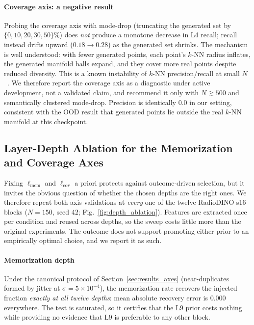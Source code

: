 \documentclass[lettersize,journal]{IEEEtran}
\begin{document}
\paragraph{Coverage axis: a negative result}
Probing the coverage axis with mode-drop (truncating the generated set by
$\{0, 10, 20, 30, 50\}\%$) does \emph{not} produce a monotone decrease in
L4 recall; recall instead drifts upward ($0.18 \to 0.28$) as the generated
set shrinks. The mechanism is well understood: with fewer generated points,
each point's $k$-NN radius inflates, the generated manifold balls expand,
and they cover more real points despite reduced diversity. This is a known
instability of $k$-NN precision/recall at small $N$~\cite{kynkaanniemi2019pr,naeem2020dc}.
We therefore report the coverage axis as a diagnostic under active
development, not a validated claim, and recommend it only with
$N \gtrsim 500$ and semantically clustered mode-drop. Precision is
identically $0.0$ in our setting, consistent with the OOD result that
generated points lie outside the real $k$-NN manifold at this checkpoint.

\subsection{Layer-Depth Ablation for the Memorization and Coverage Axes}
\label{sec:results_depth}

Fixing $\ell_{\text{mem}}$ and $\ell_{\text{cov}}$ a priori protects against
outcome-driven selection, but it invites the obvious question of whether the
chosen depths are the right ones. We therefore repeat both axis validations at
\emph{every} one of the twelve RadioDINO-s16 blocks ($N = 150$, seed $42$;
Fig.~\ref{fig:depth_ablation}). Features are extracted once per condition and
reused across depths, so the sweep costs little more than the original
experiments. The outcome does not support promoting either prior to an
empirically optimal choice, and we report it as such.

\paragraph{Memorization depth}
Under the canonical protocol of Section~\ref{sec:results_axes} (near-duplicates
formed by jitter at $\sigma = 5\times10^{-4}$), the memorization rate recovers
the injected fraction \emph{exactly at all twelve depths}: mean absolute
recovery error is $0.000$ everywhere. The test is saturated, so it certifies
that the L9 prior costs nothing while providing no evidence that L9 is
preferable to any other block.
\end{document}
